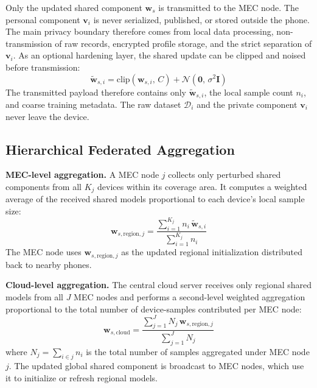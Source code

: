 \documentclass[lettersize,journal]{IEEEtran}
\begin{document}
Only the updated shared component $\mathbf{w}_s$ is transmitted to the
MEC node. The personal component $\mathbf{v}_i$ is never serialized,
published, or stored outside the phone. The main privacy boundary
therefore comes from local data processing, non-transmission of raw
records, encrypted profile storage, and the strict separation of
$\mathbf{v}_i$. As an optional hardening layer, the shared update can be
clipped and noised before transmission:
\begin{equation}
    \tilde{\mathbf{w}}_{s,i} =
    \mathrm{clip}\!\left(\mathbf{w}_{s,i},\,C\right)
    + \mathcal{N}\!\left(\mathbf{0},\,\sigma^2\mathbf{I}\right)
\end{equation}
The transmitted payload therefore contains only
$\tilde{\mathbf{w}}_{s,i}$, the local sample count $n_i$, and coarse
training metadata. The raw dataset $\mathcal{D}_i$ and the private
component $\mathbf{v}_i$ never leave the device.

\subsection{Hierarchical Federated Aggregation}

\textbf{MEC-level aggregation.}
A MEC node $j$ collects only perturbed shared components from all
$K_j$ devices within its coverage area. It computes a weighted average
of the received shared models proportional to each device's local
sample size:
\begin{equation}
    \mathbf{w}_{s,\mathrm{region},j} =
    \frac{\displaystyle\sum_{i=1}^{K_j} n_i\,\tilde{\mathbf{w}}_{s,i}}
         {\displaystyle\sum_{i=1}^{K_j} n_i}
\end{equation}
The MEC node uses $\mathbf{w}_{s,\mathrm{region},j}$ as the updated regional
initialization distributed back to nearby phones.

\textbf{Cloud-level aggregation.}
The central cloud server receives only regional shared models from all
$J$ MEC nodes and performs a second-level weighted aggregation
proportional to the total number of device-samples contributed per MEC
node:
\begin{equation}
    \mathbf{w}_{s,\mathrm{cloud}} =
    \frac{\displaystyle\sum_{j=1}^{J} N_j\,\mathbf{w}_{s,\mathrm{region},j}}
         {\displaystyle\sum_{j=1}^{J} N_j}
\end{equation}
where $N_j = \sum_{i \in j} n_i$ is the total number of samples
aggregated under MEC node $j$. The updated global shared component is
broadcast to MEC nodes, which use it to initialize or refresh regional
models.
\end{document}

